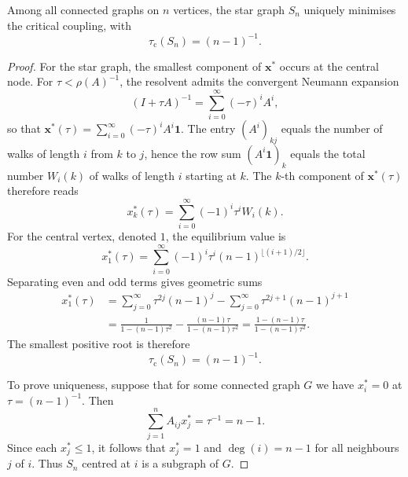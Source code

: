 \documentclass[10pt,a4paper]{amsart}
\begin{document}
\begin{lemma}\label{lem:dmax}
    Among all connected graphs on $n$ vertices, the star graph $S_n$ uniquely minimises the critical coupling, with
    \begin{equation}
        \tau_{\mathrm c}(S_{n}) = (n-1)^{-1}.
    \end{equation}
\end{lemma}

\begin{proof}
    For the star graph, the smallest component of $\mathbf{x^*}$ occurs at the central node. For $\tau<\rho(A)^{-1}$, the resolvent admits the convergent Neumann expansion
    \begin{equation*}
        (I+\tau A)^{-1} = \sum_{i=0}^\infty (-\tau)^i A^i,
    \end{equation*}
    so that $\mathbf{x^*}(\tau) = \sum_{i=0}^\infty (-\tau)^i A^i\mathbf{1}$. The entry $(A^i)_{kj}$ equals the number of walks of length $i$ from $k$ to $j$, hence the row sum $(A^i\mathbf{1})_k$ equals the total number $W_i(k)$ of walks of length $i$ starting at $k$. The $k$-th component of $\mathbf{x^*}(\tau)$ therefore reads
    \begin{equation*}
        x_k^*(\tau)=\sum_{i=0}^{\infty}(-1)^i \tau^i W_i(k).
    \end{equation*}
    For the central vertex, denoted $1$, the equilibrium value is
    \begin{equation*}
        x_1^*(\tau) = \sum_{i=0}^\infty (-1)^i \tau^i (n-1)^{\lfloor (i+1)/2 \rfloor}.
    \end{equation*}
    Separating even and odd terms gives geometric sums
    \begin{align*}
        x_1^*(\tau)
        &= \sum_{j=0}^\infty \tau^{2j} (n-1)^j
        - \sum_{j=0}^\infty \tau^{2j+1} (n-1)^{j+1} \\
        &= \frac{1}{1-(n-1)\tau^2}
        - \frac{(n-1)\tau}{1-(n-1)\tau^2}
        = \frac{1-(n-1)\tau}{1-(n-1)\tau^2}.
    \end{align*}
    The smallest positive root is therefore
    \begin{equation*}
        \tau_{\mathrm c}(S_{n}) = (n-1)^{-1}.
    \end{equation*}

    To prove uniqueness, suppose that for some connected graph $G$ we have $x_i^*=0$ at $\tau=(n-1)^{-1}$. Then
    \begin{equation*}
        \sum_{j=1}^{n} A_{ij} x_j^* = \tau^{-1} = n-1.
    \end{equation*}
    Since each $x_j^* \le 1$, it follows that $x_j^* = 1$ and $\deg(i)=n-1$ for all neighbours $j$ of $i$. Thus $S_{n}$ centred at $i$ is a subgraph of $G$.
    

\end{proof}
\end{document}

